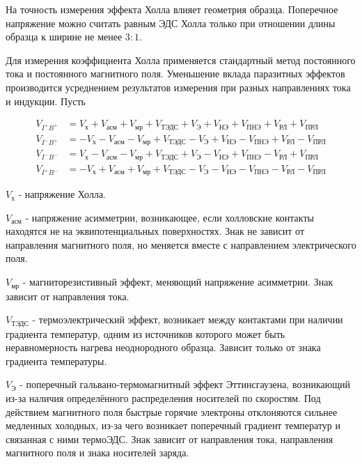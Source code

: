 На точность измерения эффекта Холла влияет геометрия образца. Поперечное напряжение можно считать равным ЭДС Холла только при отношении длины образца к ширине не менее $3:1$.

Для измерения коэффициента Холла применяется стандартный метод постоянного тока и постоянного магнитного поля. Уменьшение вклада паразитных эффектов производится усреднением результатов измерения при разных направлениях тока и индукции. Пусть

\begin{equation}
\begin{split}
V_{I^{+}B^{+}} &= V_{\text{х}} + V_{\text{асм}} + V_{\text{мр}} + V_{\text{ТЭДС}} + V_{\text{Э}} + V_{\text{НЭ}} + V_{\text{ПНЭ}} + V_{\text{РЛ}} + V_{\text{ПРЛ}} \\
V_{I^{-}B^{+}} &= -V_{\text{х}} - V_{\text{асм}} - V_{\text{мр}} + V_{\text{ТЭДС}} - V_{\text{Э}} + V_{\text{НЭ}} - V_{\text{ПНЭ}} + V_{\text{РЛ}} - V_{\text{ПРЛ}} \\
V_{I^{-}B^{-}} &= V_{\text{х}} - V_{\text{асм}} - V_{\text{мр}} + V_{\text{ТЭДС}} + V_{\text{Э}} - V_{\text{НЭ}} + V_{\text{ПНЭ}} - V_{\text{РЛ}} + V_{\text{ПРЛ}} \\
V_{I^{+}B^{-}} &= -V_{\text{х}} + V_{\text{асм}} + V_{\text{мр}} + V_{\text{ТЭДС}} - V_{\text{Э}} - V_{\text{НЭ}} - V_{\text{ПНЭ}} - V_{\text{РЛ}} - V_{\text{ПРЛ}}
\end{split}
\end{equation}

$V_{\text{х}}$ - напряжение Холла.

$V_{\text{асм}}$ - напряжение асимметрии, возникающее, если холловские контакты находятся не на эквипотенциальных поверхностях. Знак не зависит от направления магнитного поля, но меняется вместе с направлением электрического поля.

$V_{\text{мр}}$ - магниторезистивный эффект, меняющий напряжение асимметрии. Знак зависит от направления тока.

$V_{\text{ТЭДС}}$ - термоэлектрический эффект, возникает между контактами при наличии градиента температур, одним из источников которого может быть неравномерность нагрева неоднородного образца. Зависит только от знака градиента температуры.

$V_{\text{Э}}$ - поперечный гальвано-термомагнитный эффект Эттинсгаузена, возникающий из-за наличия определённого распределения носителей по скоростям. Под действием магнитного поля быстрые горячие электроны отклоняются сильнее медленных холодных, из-за чего возникает поперечный градиент температур и связанная с ними термоЭДС. Знак зависит от направления тока, направления магнитного поля и знака носителей заряда.

